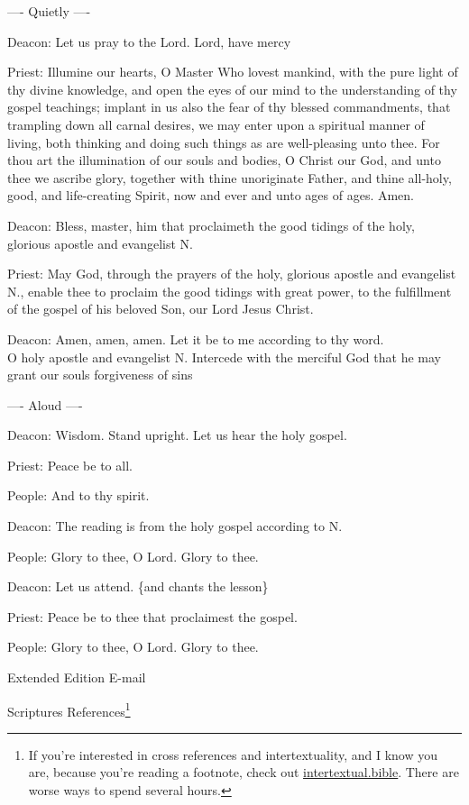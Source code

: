 \documentclass[
]{article}
\begin{document}
---- Quietly ----

Deacon: Let us pray to the Lord. Lord, have mercy

Priest: Illumine our hearts, O Master Who lovest mankind, with the pure
light of thy divine knowledge, and open the eyes of our mind to the
understanding of thy gospel teachings; implant in us also the fear of
thy blessed commandments, that trampling down all carnal desires, we may
enter upon a spiritual manner of living, both thinking and doing such
things as are well-pleasing unto thee. For thou art the illumination of
our souls and bodies, O Christ our God, and unto thee we ascribe glory,
together with thine unoriginate Father, and thine all-holy, good, and
life-creating Spirit, now and ever and unto ages of ages. Amen.

Deacon: Bless, master, him that proclaimeth the good tidings of the
holy, glorious apostle and evangelist N.

Priest: May God, through the prayers of the holy, glorious apostle and
evangelist N., enable thee to proclaim the good tidings with great
power, to the fulfillment of the gospel of his beloved Son, our Lord
Jesus Christ.

Deacon: Amen, amen, amen. Let it be to me according to thy word.\\
O holy apostle and evangelist N. Intercede with the merciful God that he
may grant our souls forgiveness of sins

---- Aloud ----

Deacon: Wisdom. Stand upright. Let us hear the holy gospel.

Priest: Peace be to all.

People: And to thy spirit.

Deacon: The reading is from the holy gospel according to N.

People: Glory to thee, O Lord. Glory to thee.

Deacon: Let us attend. \{and chants the lesson\}

Priest: Peace be to thee that proclaimest the gospel.

People: Glory to thee, O Lord. Glory to thee.

Extended Edition E-mail

Scriptures References\footnote{If you're interested in cross references
  and intertextuality, and I know you are, because you're reading a
  footnote, check out
  \href{http://intertextual.bible}{\ul{intertextual.bible}}. There are
  worse ways to spend several hours.}
\end{document}
